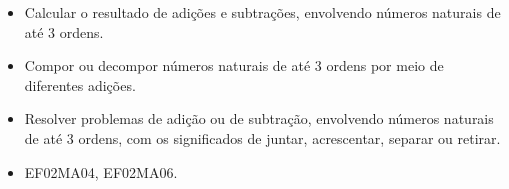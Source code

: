 
\begin{itemize}
\item Calcular o resultado de adições e subtrações, envolvendo números naturais de até 3 ordens.

\item Compor ou decompor números naturais de até 3 ordens por meio de diferentes adições.

\item Resolver problemas de adição ou de subtração, envolvendo números
naturais de até 3 ordens, com os significados de juntar, acrescentar, separar ou retirar.
\end{itemize}


\begin{itemize}
\item EF02MA04, EF02MA06.
\end{itemize}


